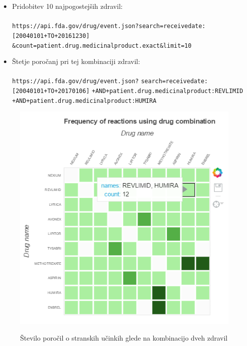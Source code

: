 \documentclass[a4paper,10pt]{article}
\begin{document}
\begin{itemize}

\item{Pridobitev 10 najpogostejših zdravil: \\ \\ \texttt{https://api.fda.gov/drug/event.json?}\newline \texttt{search=receivedate:[20040101+TO+20161230]} \newline \texttt{\&count=patient.drug.medicinalproduct.exact\&limit=10}}

\item{Štetje poročanj pri tej kombinaciji zdravil: \\ \\ \texttt{https://api.fda.gov/drug/event.json?} \newline \texttt{search=receivedate:[20040101+TO+20170106]} \newline \texttt{+AND+patient.drug.medicinalproduct:REVLIMID} \newline   \texttt{+AND+patient.drug.medicinalproduct:HUMIRA}}
\end{itemize}

\begin{figure}[H]
  \caption{Število poročil o stranskih učinkih glede na kombinacijo dveh zdravil}
  \centering
    \includegraphics[width=1\textwidth]{kombinacije.png}
    \label{stPor}
\end{figure}
\end{document}
